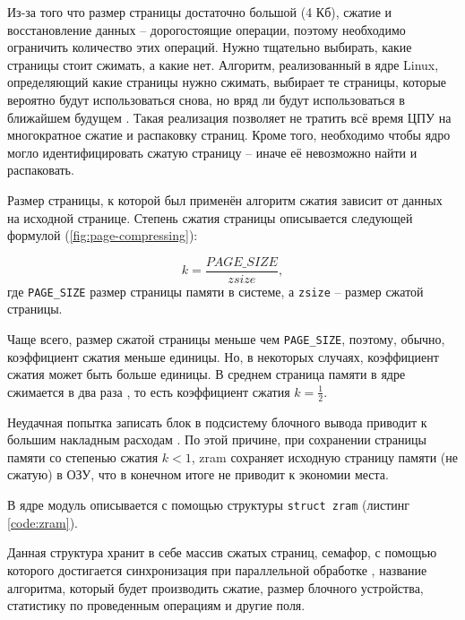 Из-за того что размер страницы достаточно большой (4 Кб), сжатие и восстановление данных -- дорогостоящие операции, поэтому необходимо ограничить количество этих операций. Нужно тщательно выбирать, какие страницы стоит сжимать, а какие нет. Алгоритм, реализованный в ядре Linux, определяющий какие страницы нужно сжимать, выбирает те страницы, которые вероятно будут использоваться снова, но вряд ли будут использоваться в ближайшем будущем \cite{in-kernel-memory-compression}. Такая реализация позволяет не тратить всё время ЦПУ на многократное сжатие и распаковку страниц. Кроме того, необходимо чтобы ядро могло идентифицировать сжатую страницу -- иначе её невозможно найти и распаковать.

Размер страницы, к которой был применён алгоритм сжатия зависит от данных на исходной странице. Степень сжатия страницы описывается следующей формулой (\ref{fig:page-compressing}):

\begin{equation}\label{fig:page-compressing}
	k = \frac{PAGE\_SIZE}{zsize},
\end{equation}
где \texttt{PAGE\_SIZE} размер страницы памяти в системе, а \texttt{zsize} -- размер сжатой страницы. 

Чаще всего, размер сжатой страницы меньше чем \texttt{PAGE\_SIZE}, поэтому, обычно, коэффициент сжатия меньше единицы. Но, в некоторых случаях, коэффициент сжатия может быть больше единицы. В среднем страница памяти в ядре сжимается в два раза \cite{in-kernel-memory-compression}, то есть коэффициент сжатия $ k =\frac{1}{2}$.

Неудачная попытка записать блок в подсистему блочного вывода приводит к большим накладным расходам \cite{in-kernel-memory-compression}. По этой причине, при сохранении страницы памяти со степенью сжатия $k < 1$, zram сохраняет исходную страницу памяти (не сжатую) в ОЗУ, что в конечном итоге не приводит к экономии места.

В ядре модуль описывается с помощью структуры \texttt{struct zram} (листинг \ref{code:zram}).

Данная структура хранит в себе массив сжатых страниц, семафор, с помощью которого достигается синхронизация при параллельной обработке \cite{in-kernel-memory-compression}, название алгоритма, который будет производить сжатие, размер блочного устройства, статистику по проведенным операциям и другие поля.

